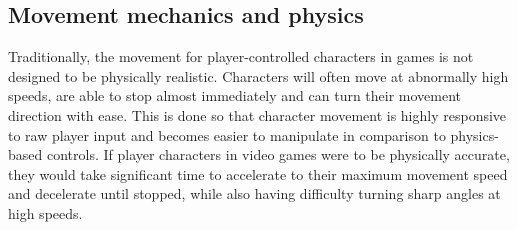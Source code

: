 

\subsection{Movement mechanics and physics}


Traditionally, the movement for player-controlled characters in games is not designed to be physically realistic. Characters will often move at abnormally high speeds, are able to stop almost immediately and can turn their movement direction with ease. This is done so that character movement is highly responsive to raw player input and becomes easier to manipulate in comparison to physics-based controls. If player characters in video games were to be physically accurate, they would take significant time to accelerate to their maximum movement speed and decelerate until stopped, while also having difficulty turning sharp angles at high speeds.

